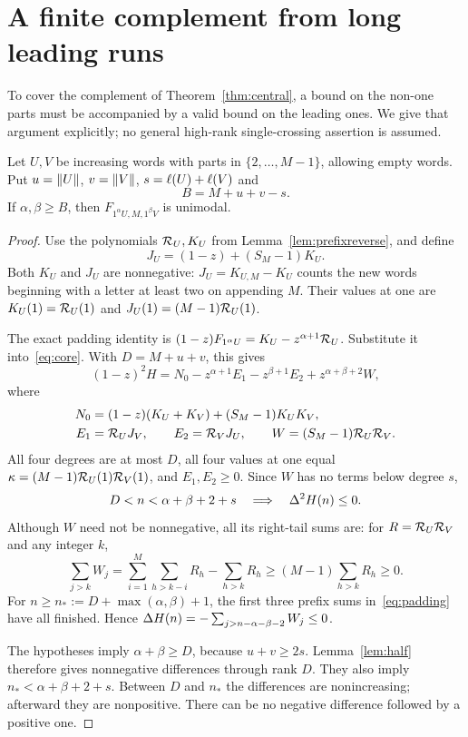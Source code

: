 \section{A finite complement from long leading runs}\label{sec:completion}
To cover the complement of Theorem~\ref{thm:central}, a bound on the non-one parts must be accompanied by a valid bound on the leading ones. We give that argument explicitly; no general high-rank single-crossing assertion is assumed.

\begin{lemma}\label{lem:longones}
Let $U,V$ be increasing words with parts in $\{2,\ldots,M-1\}$, allowing empty words. Put $u=\lVert U\rVert$, $v=\lVert V\rVert$, $s=\ell(U)+\ell(V)$ and
\[
 B=M+u+v-s.
\]
If $\alpha,\beta\ge B$, then $F_{1^\alpha U,M,1^\beta V}$ is unimodal.
\end{lemma}
\begin{proof}
Use the polynomials $\mathcal R_U,K_U$ from Lemma~\ref{lem:prefixreverse}, and define
\[
 J_U=(1-z)+(S_M-1)K_U.
\]
Both $K_U$ and $J_U$ are nonnegative: $J_U=K_{U,M}-K_U$ counts the new words beginning with a letter at least two on appending $M$. Their values at one are $K_U(1)=\mathcal R_U(1)$ and $J_U(1)=(M-1)\mathcal R_U(1)$.

The exact padding identity is $(1-z)F_{1^\alpha U}=K_U-z^{\alpha+1}\mathcal R_U$. Substitute it into~\eqref{eq:core}. With $D=M+u+v$, this gives
\begin{equation}\label{eq:padding}
 (1-z)^2H=N_0-z^{\alpha+1}E_1-z^{\beta+1}E_2
                 +z^{\alpha+\beta+2}W,
\end{equation}
where
\begin{align*}
 N_0&=(1-z)(K_U+K_V)+(S_M-1)K_UK_V,\\
 E_1&=\mathcal R_UJ_V,\qquad E_2=\mathcal R_VJ_U,\qquad
 W=(S_M-1)\mathcal R_U\mathcal R_V.
\end{align*}
All four degrees are at most $D$, all four values at one equal $\kappa=(M-1)\mathcal R_U(1)\mathcal R_V(1)$, and $E_1,E_2\ge0$. Since $W$ has no terms below degree $s$,
\[
 D<n<\alpha+\beta+2+s\quad\Longrightarrow\quad\Delta^2H(n)\le0.
\]
Although $W$ need not be nonnegative, all its right-tail sums are: for $R=\mathcal R_U\mathcal R_V$ and any integer $k$,
\[
 \sum_{j>k}W_j
 =\sum_{i=1}^M\sum_{h>k-i}R_h-\sum_{h>k}R_h
 \ge(M-1)\sum_{h>k}R_h\ge0.
\]
For $n\ge n_*:=D+\max(\alpha,\beta)+1$, the first three prefix sums in~\eqref{eq:padding} have all finished. Hence $\Delta H(n)=-\sum_{j>n-\alpha-\beta-2}W_j\le0$.

The hypotheses imply $\alpha+\beta\ge D$, because $u+v\ge2s$. Lemma~\ref{lem:half} therefore gives nonnegative differences through rank $D$. They also imply $n_*<\alpha+\beta+2+s$. Between $D$ and $n_*$ the differences are nonincreasing; afterward they are nonpositive. There can be no negative difference followed by a positive one.
\end{proof}


